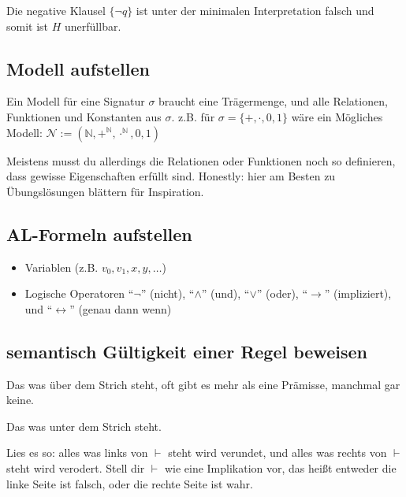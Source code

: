 \documentclass[
    ngerman,
    color=3b,
    summary,
    boxarc,
    main,
    fleqn,
    leqno,
]{rubos-tuda-template}
\begin{document}
    Die negative Klausel $\{\lnot q\}$ ist unter der minimalen Interpretation falsch und somit ist $H$ unerfüllbar.
    \clearpage
    \subsection{Modell aufstellen}
    Ein Modell für eine Signatur $\sigma$ braucht eine Trägermenge, und alle Relationen, Funktionen und Konstanten aus $\sigma$. z.B. für $\sigma = \{+,\cdot,0,1\}$ wäre ein Mögliches Modell: $\mathcal{N}:=(\mathbb{N},+^{\mathbb{N}},\cdot^{\mathbb{N}},0,1)$

    Meistens musst du allerdings die Relationen oder Funktionen noch so definieren, dass gewisse Eigenschaften erfüllt sind. Honestly: hier am Besten zu Übungslösungen blättern für Inspiration.

    \subsection{AL-Formeln aufstellen}
    \begin{definition}[Aussagenlogik]\mbox{}
        \begin{itemize}
            \item Variablen (z.B. $v_0, v_1, x, y,\dots $)
            \item Logische Operatoren \enquote{$\lnot$} (nicht), \enquote{$\land$} (und), \enquote{$\lor$} (oder),
                \enquote{$\rightarrow{}$} (impliziert), und \enquote{$\leftrightarrow$} (genau dann wenn)
        \end{itemize}
    \end{definition}

    \subsection{semantisch Gültigkeit einer Regel beweisen}
    \begin{definition}[Prämisse]
        Das was über dem Strich steht, oft gibt es mehr als eine Prämisse, manchmal gar keine.
    \end{definition}
    \begin{definition}[Konklusion]
        Das was unter dem Strich steht.
    \end{definition}
    \begin{definition}[$\vdash$]
        Lies es so: alles was links von $\vdash$ steht wird verundet, und alles was rechts von $\vdash$ steht wird verodert. Stell dir $\vdash$ wie eine Implikation vor, das heißt entweder die linke Seite ist falsch, oder die rechte Seite ist wahr.
    \end{definition}
\end{document}
